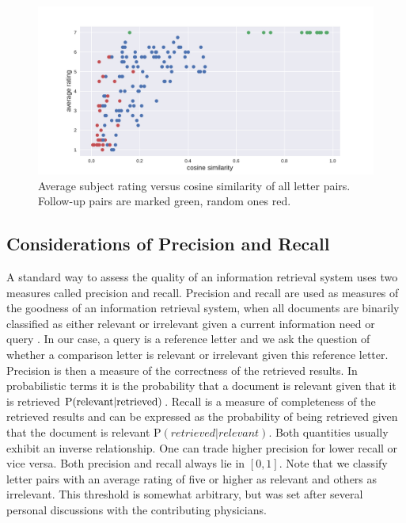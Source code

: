 \begin{figure}
	\includegraphics[width=\linewidth]{figures/rating_vs_similarity}
	\caption{Average subject rating versus cosine similarity of all letter pairs. Follow-up pairs are marked green, random ones red.}
	\label{fig:all_points}
\end{figure}


\subsection*{Considerations of Precision and Recall}
A standard way to assess the quality of an information retrieval system uses two measures called precision and recall. Precision and recall are used as measures of the goodness of an information retrieval system, when all documents are binarily classified as either relevant or irrelevant given a current information need or query \citep{Manning2008prerec}. In our case, a query is a reference letter and we ask the question of whether a comparison letter is relevant or irrelevant given this reference letter. Precision is then a measure of the correctness of the retrieved results. In probabilistic terms it is the probability that a document is relevant given that it is retrieved $\rm{P}(relevant|retrieved)$. Recall is a measure of completeness of the retrieved results and can be expressed as the probability of being retrieved given that the document is relevant P$(retrieved|relevant)$. Both quantities usually exhibit an inverse relationship. One can trade higher precision for lower recall or vice versa. Both precision and recall always lie in $[0,1]$. Note that we classify letter pairs with an average rating of five or higher as relevant and others as irrelevant. This threshold is somewhat arbitrary, but was set after several personal discussions with the contributing physicians.

